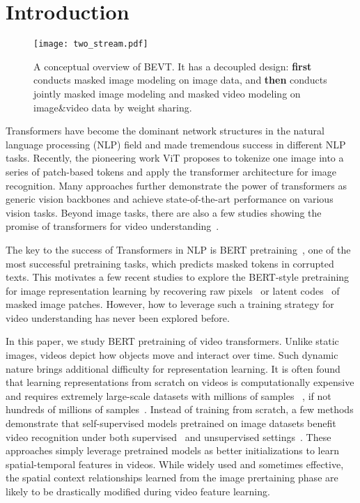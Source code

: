 \documentclass[10pt,twocolumn,letterpaper]{article}
\makeatletter
\newcommand*{\system}{BEVT\@\xspace}
\makeatother
\begin{document}
\section{Introduction}
\label{sec:intro}

\begin{figure}[t]
\begin{center}
   \texttt{[image: two\_stream.pdf]}
\end{center}
   \vspace{-0.2in}
   \caption{A conceptual overview of \system. It has a decoupled design: \textbf{first} conducts masked image modeling on image data, and \textbf{then} conducts jointly masked image modeling and masked video modeling on image\&video data by weight sharing.}
\label{fig:decoder}
\end{figure}

Transformers\cite{vaswani2017attention,wolf2020transformers}  have become the dominant network structures in the natural language processing (NLP) field and made tremendous success in different NLP tasks. Recently, the pioneering work ViT\cite{dosovitskiy2020image} proposes to tokenize one image into a series of patch-based tokens and apply the transformer architecture for image recognition.  Many approaches \cite{chen2021mobile,dong2021cswin,liu2021swin,wu2021cvt} further demonstrate the power of transformers as generic vision backbones and achieve state-of-the-art performance on various vision tasks. Beyond image tasks, there are also a few studies showing the promise of transformers for video understanding~\cite{liu2021video,arnab2021vivit}.

The key to the success of Transformers in NLP is BERT pretraining~\cite{devlin2018bert,liu2019roberta,bao2020unilmv2}, one of the most successful pretraining tasks, which predicts masked tokens in corrupted texts. This motivates a few recent studies to explore the BERT-style pretraining for image representation learning by recovering raw pixels~\cite{he2021masked} or latent codes~\cite{bao2021beit,dong2021peco} of masked image patches. However, how to leverage such a training strategy for video understanding has never been explored before.

In this paper, we study BERT pretraining of video transformers. Unlike static images, videos depict how objects move and interact over time. Such dynamic nature brings additional difficulty for representation learning.  It is often found that learning representations from scratch on videos is computationally expensive and requires extremely large-scale datasets with millions of samples ~\cite{largscale2021}, if not hundreds of millions of samples~\cite{akbari2021vatt}. Instead of training from scratch, a few methods demonstrate that self-supervised models pretrained on image datasets benefit video recognition under both supervised~\cite{liu2021video,arnab2021vivit} and unsupervised settings~\cite{gberta_2021_ICML}.  These approaches simply leverage pretrained models as better initializations to learn spatial-temporal features in videos. While widely used and sometimes effective, the spatial context relationships learned from the image prertaining phase are likely to be drastically modified during video feature learning.  
\end{document}
